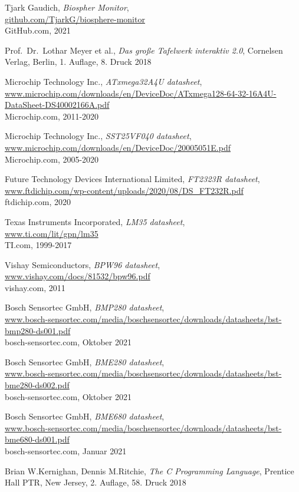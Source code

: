 \documentclass[12pt, a4paper, oneside]{report}
\begin{document}
\begin{thebibliography}{9}
\raggedright 

  Tjark Gaudich,
  \textit{Biospher Monitor},\\
  \url{github.com/TjarkG/biosphere-monitor}\\
  GitHub.com,
  2021
  
  Prof.~Dr.~Lothar Meyer et al.,
  \textit{Das große Tafelwerk interaktiv 2.0},
  Cornelsen Verlag, Berlin,
  1. Auflage, 8. Druck 2018
  
  Microchip Technology Inc.,
  \textit{ATxmega32A4U datasheet},\\
  \url{www.microchip.com/downloads/en/DeviceDoc/ATxmega128-64-32-16A4U-DataSheet-DS40002166A.pdf}\\
  Microchip.com,
  2011-2020
  
  Microchip Technology Inc.,
  \textit{SST25VF040 datasheet},\\
  \url{www.microchip.com/downloads/en/DeviceDoc/20005051E.pdf}\\
  Microchip.com,
  2005-2020
  
  Future Technology Devices International Limited,
  \textit{FT2323R datasheet},\\
  \url{www.ftdichip.com/wp-content/uploads/2020/08/DS_FT232R.pdf}\\
  ftdichip.com, 2020
  
  Texas Instruments Incorporated,
  \textit{LM35 datasheet},\\
  \url{www.ti.com/lit/gpn/lm35}\\
  TI.com,
  1999-2017
  
  Vishay Semiconductors,
  \textit{BPW96 datasheet},\\
  \url{www.vishay.com/docs/81532/bpw96.pdf}\\
  vishay.com,
  2011
  
  Bosch Sensortec GmbH,
  \textit{BMP280 datasheet},\\
  \url{www.bosch-sensortec.com/media/boschsensortec/downloads/datasheets/bst-bmp280-ds001.pdf}\\
  bosch-sensortec.com,
  Oktober 2021
  
  Bosch Sensortec GmbH,
  \textit{BME280 datasheet},\\
  \url{www.bosch-sensortec.com/media/boschsensortec/downloads/datasheets/bst-bme280-ds002.pdf}\\
  bosch-sensortec.com,
  Oktober 2021
  
  Bosch Sensortec GmbH,
  \textit{BME680 datasheet},\\
  \url{www.bosch-sensortec.com/media/boschsensortec/downloads/datasheets/bst-bme680-ds001.pdf}\\
  bosch-sensortec.com,
  Januar 2021

  Brian W.Kernighan, Dennis M.Ritchie,
  \textit{The C Programming Language},
  Prentice Hall PTR, New Jersey,
  2. Auflage, 58. Druck 2018

\end{thebibliography}
\end{document}
